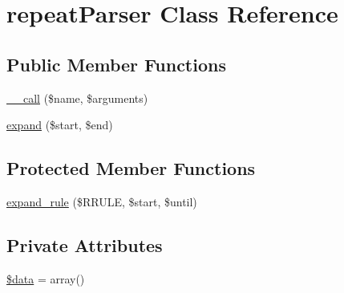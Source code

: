 \hypertarget{classrepeatParser}{
\section{repeatParser Class Reference}
\label{classrepeatParser}
}
\subsection*{Public Member Functions}
\begin{DoxyCompactItemize}
\item 
\hyperlink{classrepeatParser_a3815af62ed9d37b2dcaa175379bbfeca}{\_\-\_\-call} (\$name, \$arguments)
\item 
\hyperlink{classrepeatParser_a1bf43fc9d8d04fc2e5fa846269f30e70}{expand} (\$start, \$end)
\end{DoxyCompactItemize}
\subsection*{Protected Member Functions}
\begin{DoxyCompactItemize}
\item 
\hyperlink{classrepeatParser_aee0716ed16629ab6df05dd9c28044514}{expand\_\-rule} (\$RRULE, \$start, \$until)
\end{DoxyCompactItemize}
\subsection*{Private Attributes}
\begin{DoxyCompactItemize}
\item 
\hyperlink{classrepeatParser_a6efc15b5a2314dd4b5aaa556a375c6d6}{\$data} = array()
\end{DoxyCompactItemize}


